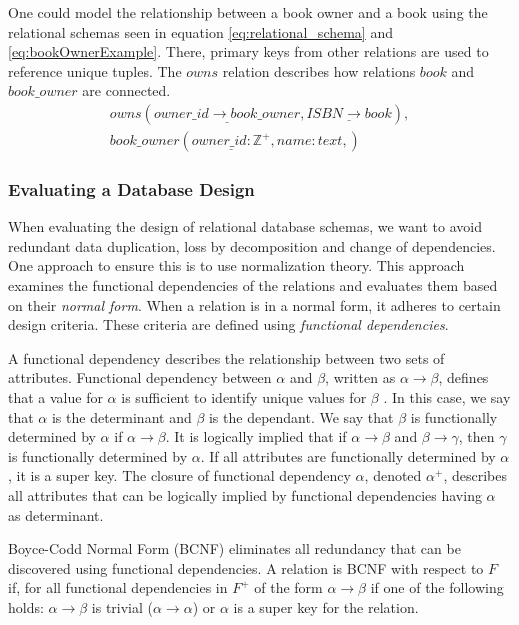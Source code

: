 One could model the relationship between a book owner and a book using the relational schemas seen in equation \ref{eq:relational_schema} and \ref{eq:bookOwnerExample}.
There, primary keys from other relations are used to reference unique tuples. The $owns$ relation describes how relations $book$ and $book\_owner$ are connected. 
\begin{equation}\label{eq:bookOwnerExample}
    \begin{split}
        owns(\underline{owner\_id \rightarrow book\_owner}, \underline{ISBN \rightarrow book}), \\
        book\_owner(\underline{owner\_id:\mathbb{Z}^+}, name:text,)
    \end{split}
\end{equation}

\subsubsection*{Evaluating a Database Design}
When evaluating the design of relational database schemas, we want to avoid redundant data duplication, loss by decomposition and change of dependencies\cite{DBSBook}.
One approach to ensure this is to use normalization theory\cite{DBSBook}. 
This approach examines the functional dependencies of the relations and evaluates them based on their \textit{normal form}.
When a relation is in a normal form, it adheres to certain design criteria. 
These criteria are defined using \textit{functional dependencies}.

A functional dependency describes the relationship between two sets of attributes. 
Functional dependency between $\alpha$ and $\beta$, written as $\alpha \rightarrow \beta$, defines that a value for $\alpha$ is sufficient to identify unique values for $\beta$ \cite{DBSBook}.
In this case, we say that $\alpha$ is the determinant and $\beta$ is the dependant. 
We say that $\beta$ is functionally determined by $\alpha$ if $\alpha \rightarrow \beta$.
It is logically implied that if $\alpha \rightarrow \beta$ and $\beta \rightarrow \gamma$, then $\gamma$ is functionally determined by $\alpha$.
If all attributes are functionally determined by $\alpha$, it is a super key\cite{DBSBook}.
The closure of functional dependency $\alpha$, denoted $\alpha^+$, describes all attributes that can be logically implied by functional dependencies having $\alpha$ as determinant\cite{DBSBook}. 

Boyce-Codd Normal Form (BCNF) eliminates all redundancy that can be discovered using functional dependencies\cite{DBSBook}. 
A relation is BCNF with respect to $F$ if, for all functional dependencies in $F^+$ of the form $\alpha \rightarrow \beta$ if one of the following holds:
$\alpha \rightarrow \beta$ is trivial ($\alpha \rightarrow \alpha$) or $\alpha$ is a super key for the relation.

